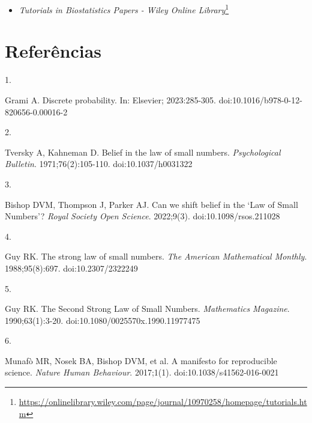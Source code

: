 \documentclass[
  a4paper,
]{book}
\providecommand{\tightlist}{%
  \setlength{\itemsep}{0pt}\setlength{\parskip}{0pt}}
\newlength{\cslhangindent}
\newlength{\csllabelwidth}
\newlength{\cslentryspacingunit} %
\newenvironment{CSLReferences}[2] %
 {%
  \setlength{\parindent}{0pt}
  \ifodd #1
  \let\oldpar\par
  \def\par{\hangindent=\cslhangindent\oldpar}
  \fi
  \setlength{\parskip}{#2\cslentryspacingunit}
 }%
 {}
\newcommand{\CSLLeftMargin}[1]{\parbox[t]{\csllabelwidth}{#1}}
\newcommand{\CSLRightInline}[1]{\parbox[t]{\linewidth - \csllabelwidth}{#1}\break}
\renewcommand{\href}[2]{#2\footnote{\url{#1}}}
\newcommand{\DisableFootNotes}{%
  \renewcommand{\footnote}[2][]{\relax}
}
\begin{document}
\begin{itemize}
\tightlist
\item
  \href{https://onlinelibrary.wiley.com/page/journal/10970258/homepage/tutorials.htm}{\emph{Tutorials in Biostatistics Papers - Wiley Online Library}}
\end{itemize}

\hypertarget{referuxeancias}{%
\chapter*{\texorpdfstring{\textbf{Referências}}{Referências}}\label{referuxeancias}}

\DisableFootNotes

\hypertarget{refs}{}
\begin{CSLReferences}{0}{0}
\leavevmode{}%
\CSLLeftMargin{1. }%
\CSLRightInline{Grami A. Discrete probability. In: Elsevier; 2023:285-305. doi:\href{https://doi.org/10.1016/b978-0-12-820656-0.00016-2}{10.1016/b978-0-12-820656-0.00016-2}}

\leavevmode{}%
\CSLLeftMargin{2. }%
\CSLRightInline{Tversky A, Kahneman D. Belief in the law of small numbers. \emph{Psychological Bulletin}. 1971;76(2):105-110. doi:\href{https://doi.org/10.1037/h0031322}{10.1037/h0031322}}

\leavevmode{}%
\CSLLeftMargin{3. }%
\CSLRightInline{Bishop DVM, Thompson J, Parker AJ. Can we shift belief in the {`}Law of Small Numbers{'}? \emph{Royal Society Open Science}. 2022;9(3). doi:\href{https://doi.org/10.1098/rsos.211028}{10.1098/rsos.211028}}

\leavevmode{}%
\CSLLeftMargin{4. }%
\CSLRightInline{Guy RK. The strong law of small numbers. \emph{The American Mathematical Monthly}. 1988;95(8):697. doi:\href{https://doi.org/10.2307/2322249}{10.2307/2322249}}

\leavevmode{}%
\CSLLeftMargin{5. }%
\CSLRightInline{Guy RK. The Second Strong Law of Small Numbers. \emph{Mathematics Magazine}. 1990;63(1):3-20. doi:\href{https://doi.org/10.1080/0025570x.1990.11977475}{10.1080/0025570x.1990.11977475}}

\leavevmode{}%
\CSLLeftMargin{6. }%
\CSLRightInline{Munafò MR, Nosek BA, Bishop DVM, et al. A manifesto for reproducible science. \emph{Nature Human Behaviour}. 2017;1(1). doi:\href{https://doi.org/10.1038/s41562-016-0021}{10.1038/s41562-016-0021}}


\end{CSLReferences}
\end{document}
